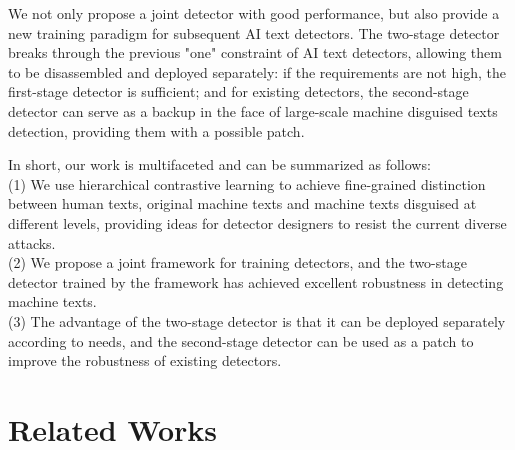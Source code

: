 \documentclass[11pt]{article}
\begin{document}
	We not only propose a joint detector with good performance, but also provide a new training paradigm for subsequent AI text detectors. The two-stage detector breaks through the previous "one" constraint of AI text detectors, allowing them to be disassembled and deployed separately: if the requirements are not high, the first-stage detector is sufficient; and for existing detectors, the second-stage detector can serve as a backup in the face of large-scale machine disguised texts detection, providing them with a possible patch.
	
	In short, our work is multifaceted and can be summarized as follows:\\
	(1) We use hierarchical contrastive learning to achieve fine-grained distinction between human texts, original machine texts and machine texts disguised at different levels, providing ideas for detector designers to resist the current diverse attacks.\\
	(2) We propose a joint framework for training detectors, and the two-stage detector trained by the framework has achieved excellent robustness in detecting machine texts.\\
	(3) The advantage of the two-stage detector is that it can be deployed separately according to needs, and the second-stage detector can be used as a patch to improve the robustness of existing detectors.
	

	\section{Related Works}
\end{document}
